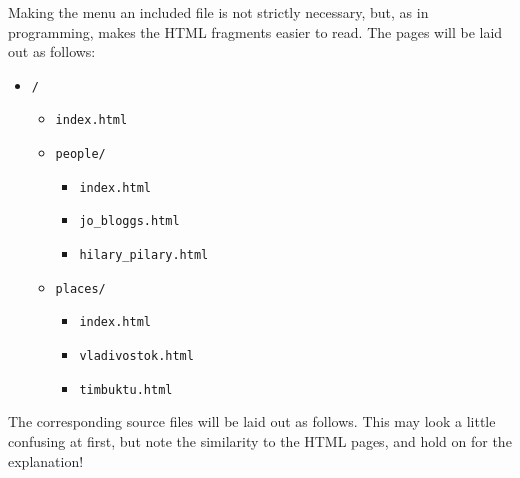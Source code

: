 \documentclass[english]{scrartcl}
\begin{document}
Making the menu an included file is not strictly necessary, but, as in programming, makes the HTML fragments easier to read. The pages will be laid out as follows:

\begin{itemize}
\item \verb|/|
  \begin{itemize}
  \item \verb|index.html|
  \item \verb|people/|
    \begin{itemize}
    \item \verb|index.html|
    \item \verb|jo_bloggs.html|
    \item \verb|hilary_pilary.html|
    \end{itemize}
  \item \verb|places/|
    \begin{itemize}
    \item \verb|index.html|
    \item \verb|vladivostok.html|
    \item \verb|timbuktu.html|
    \end{itemize}
  \end{itemize}
\end{itemize}

The corresponding source files will be laid out as follows. This may look a little confusing at first, but note the similarity to the HTML pages, and hold on for the explanation!
\end{document}
